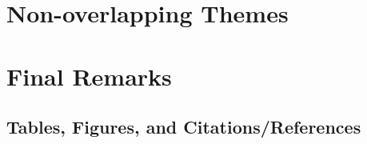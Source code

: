 \documentclass{sig-alternate}
\begin{document}
\section{Non-overlapping Themes}
\label{non-overlapping themes}

\section{Final Remarks}
\label{final remarks}

\subsection{Tables, Figures, and Citations/References}



\balance
\end{document}
